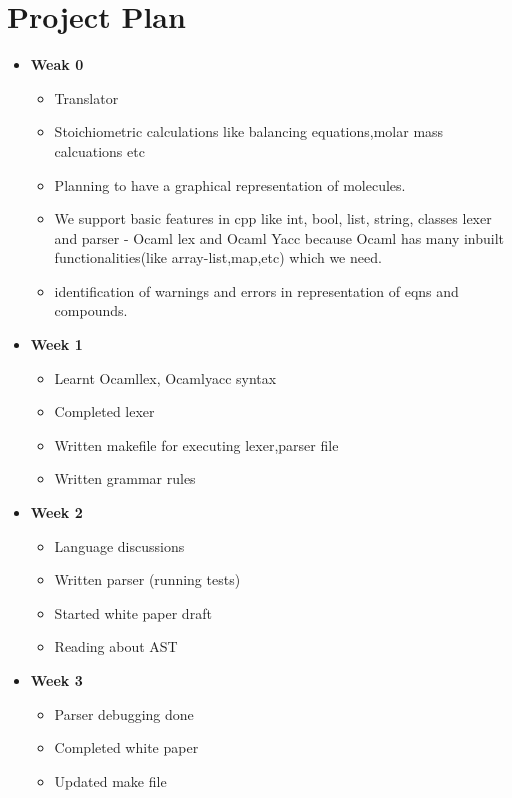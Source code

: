 \documentclass[english,a4paper,12pt]{report}
\begin{document}
\chapter{Project Plan}
\vspace{-1cm}
\begin{itemize}
    \item \textbf{Weak 0} \begin{itemize}
        \item Translator
        \item Stoichiometric calculations like balancing equations,molar mass calcuations etc
        \item Planning to have a graphical representation of molecules.
        \item We support basic features in cpp like int, bool, list, string, classes
                lexer and parser - Ocaml lex and Ocaml Yacc because Ocaml has many inbuilt functionalities(like array-list,map,etc) which we need.
        \item identification of warnings and errors in representation of eqns and compounds.
    \end{itemize}
    \item \textbf{Week 1 }\begin{itemize}
        \item Learnt Ocamllex, Ocamlyacc syntax
        \item Completed lexer
        \item Written makefile for executing lexer,parser file
        \item Written grammar rules
        
    \end{itemize}
        \item\textbf{ Week 2 }\begin{itemize}
        \item Language discussions
        \item Written parser  (running tests)
        \item Started white paper draft
        \item Reading about AST
      
        
    \end{itemize}
        \item\textbf{ Week 3}\begin{itemize}
        \item Parser debugging done
        \item Completed white paper
        \item Updated make file
      

\end{itemize}
\end{itemize}
\end{document}
